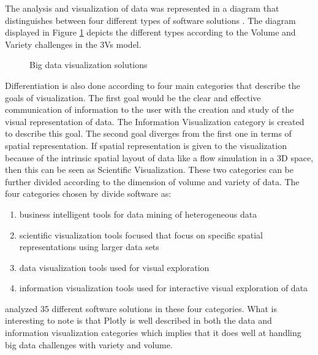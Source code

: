 The analysis and visualization of data was represented in a diagram that distinguishes between four different types of software solutions \cite{caldarola2017big}. The diagram displayed in Figure \ref{fig:10} depicts the different types according to the Volume and Variety challenges in the 3Vs model. 
\begin{figure}[H]
	\centering{}
	\caption{Big data visualization solutions}\label{fig:10}
\end{figure}
Differentiation is also done according to four main categories that describe the goals of visualization. The first goal would be the clear and effective communication of information to the user with the creation and study of the visual representation of data. The Information Visualization category is created to describe this goal. The second goal diverges from the first one in terms of spatial representation. If spatial representation is given to the visualization because of the intrinsic spatial layout of data like a flow simulation in a 3D space, then this can be seen as Scientific Visualization. These two categories can be further divided according to the dimension of volume and variety of data. The four categories chosen by \cite{caldarola2017big}  divide software as:
\begin{enumerate}
	\item business intelligent tools for data mining of heterogeneous data
	\item scientific visualization tools focused that focus on specific spatial representations using larger data sets
	\item data visualization tools used for visual exploration
	\item information visualization tools used for interactive visual exploration of data
\end{enumerate}
\cite{caldarola2017big} analyzed 35 different software solutions in these four categories. What is interesting to note is that Plotly is well described in both the data and information visualization categories which implies that it does well at handling big data challenges with variety and volume.

